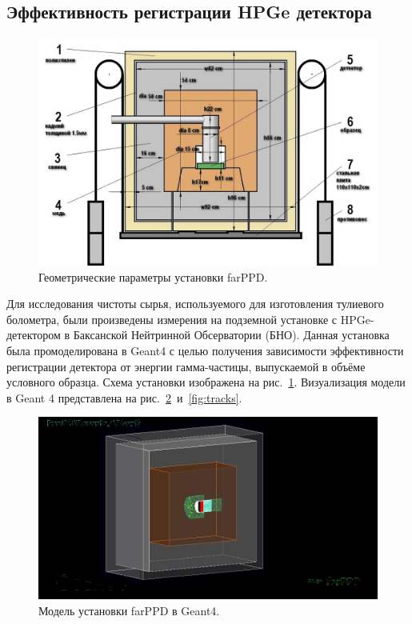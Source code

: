 \documentclass[a4paper,article,14pt]{extarticle}
\begin{document}
\subsection{Эффективность регистрации HPGe детектора}
\begin{figure}[h]
    \centering
    \includegraphics[width=.9\textwidth]{images/farPPD_size.jpg}
    \caption{Геометрические параметры установки farPPD.}\label{fig:geom}
\end{figure}
Для исследования чистоты сырья, используемого для изготовления тулиевого болометра, были произведены измерения на подземной установке с HPGe-детектором в Баксанской Нейтринной Обсерватории (БНО).
Данная установка была промоделирована в Geant4 с целью получения зависимости эффективности регистрации детектора от энергии гамма-частицы, выпускаемой в объёме условного образца.
Схема установки изображена на рис.~\ref{fig:geom}.
Визуализация модели в Geant 4 представлена на рис.~\ref{fig:vis}~и~\ref{fig:tracks}.
\begin{figure}[t]
    \centering
    \includegraphics[width=.9\textwidth]{images/Visualisation.jpg}
    \caption{Модель установки farPPD в Geant4.}\label{fig:vis}
\end{figure}
\end{document}
